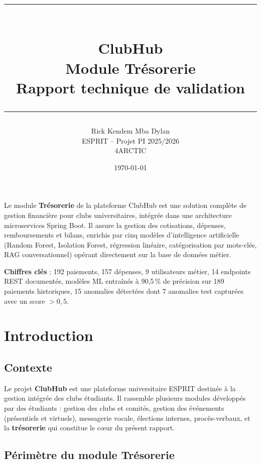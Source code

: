 \documentclass[11pt,a4paper]{article}
\title{
  \vspace{-1.5cm}
  \begin{center}
    \rule{\linewidth}{0.4pt}\\[0.4cm]
    {\Huge \textbf{\textcolor{primary}{ClubHub}}}\\[0.4cm]
    {\LARGE \textcolor{accent}{Module Trésorerie}}\\[0.3cm]
    {\large Rapport technique de validation}\\[0.2cm]
    \rule{\linewidth}{0.4pt}
  \end{center}
}
\author{
  \large Rick Kendem Mba Dylan\\[0.2em]
  \normalsize ESPRIT -- Projet PI 2025/2026\\
  \normalsize 4ARCTIC
}
\date{\today}
\begin{document}
\maketitle
\thispagestyle{empty}

\vfill
\begin{center}
  \begin{minipage}{0.85\textwidth}
    \begin{infobox}
      Le module \textbf{Trésorerie} de la plateforme ClubHub est une solution complète de gestion financière pour clubs universitaires, intégrée dans une architecture microservices Spring Boot. Il assure la gestion des cotisations, dépenses, remboursements et bilans, enrichis par cinq modèles d'intelligence artificielle (Random Forest, Isolation Forest, régression linéaire, catégorisation par mots-clés, RAG conversationnel) opérant directement sur la base de données métier.

      \medskip
      \textbf{Chiffres clés} : 192 paiements, 157 dépenses, 9 utilisateurs métier, 14 endpoints REST documentés, modèles ML entraînés à 90{,}5\,\% de précision sur 189 paiements historiques, 15 anomalies détectées dont 7 anomalies test capturées avec un score \(>0{,}5\).
    \end{infobox}
  \end{minipage}
\end{center}
\vfill

\newpage
\tableofcontents
\newpage

\section{Introduction}

\subsection{Contexte}

Le projet \textbf{ClubHub} est une plateforme universitaire ESPRIT destinée à la gestion intégrée des clubs étudiants. Il rassemble plusieurs modules développés par des étudiants : gestion des clubs et comités, gestion des événements (présentiels et virtuels), messagerie vocale, élections internes, procès-verbaux, et la \textbf{trésorerie} qui constitue le cœur du présent rapport.

\subsection{Périmètre du module Trésorerie}
\end{document}
